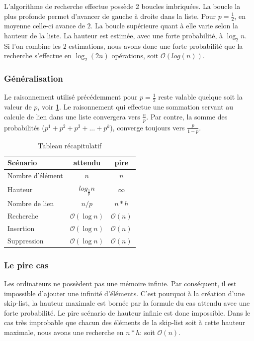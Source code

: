 \documentclass[hidelinks,a4paper, 12pt]{article}
\begin{document}
	L'algorithme de recherche effectue possède 2 boucles imbriquées. La boucle la plus profonde permet d'avancer de gauche à droite dans la liste. Pour $p=\frac{1}{2}$, en moyenne celle-ci avance de $2$. La boucle supérieure quant à elle varie selon la hauteur de la liste. La hauteur est estimée, avec une forte probabilité, à $\log_{2} n $. Si l'on combine les 2 estimations, nous avons donc une forte probabilité que la recherche s'effectue en $\log_{2}( 2n )$ opérations, soit $\mathcal{O}(log(n))$.
	
	
	\subsubsection{Généralisation}
	
	Le raisonnement utilisé précédemment pour $p=\frac{1}{2}$ reste valable quelque soit la valeur de $p$, voir \cref{recap}. Le raisonnement qui effectue une sommation servant au calcule de lien dans une liste convergera vers $\frac{n}{p}$. Par contre, la somme des probabilités ($p^1 + p^2 + p^3 + ... + p^k$), converge toujours vers $\frac{p}{1-p}$. 
	 	
	 \begin{table}[h]
	 \begin{tabular}{|l|c|c|}
	 	\hline
	 	Scénario & attendu & pire \\
	 	\hline
	 	Nombre d'élément & $n$ & $n$ \\ 
	 	\hline
	 	Hauteur & $log_{\frac{1}{p}} n$ & $\infty$ \\ 
	 	\hline
	 	Nombre de lien & $n/p$ & $n*h$ \\ 
	 	\hline
	 	Recherche & $\mathcal{O}(\log n)$ & $\mathcal{O}(n)$ \\ 
	 	\hline
	 	Insertion & $\mathcal{O}(\log n)$ & $\mathcal{O}(n)$ \\
	 	\hline
	 	Suppression & $\mathcal{O}(\log n)$ & $\mathcal{O}(n)$\\
	 	\hline
	 \end{tabular}
	 \caption{Tableau récapitulatif}
	 \label{recap}
	 \end{table}
	 
	 \subsubsection{Le pire cas}
	 	
	 Les ordinateurs ne possèdent pas une mémoire infinie. Par conséquent, il est impossible d'ajouter une infinité d'éléments. C'est pourquoi à la création d'une skip-list, la hauteur maximale est bornée par la formule du cas attendu avec une forte probabilité. Le pire scénario de hauteur infinie est donc impossible. Dans le cas très improbable que chacun des éléments de la skip-list soit à cette hauteur maximale, nous avons une recherche en $n*h$: soit $\mathcal{O}(n)$. 
	 	
\end{document}
